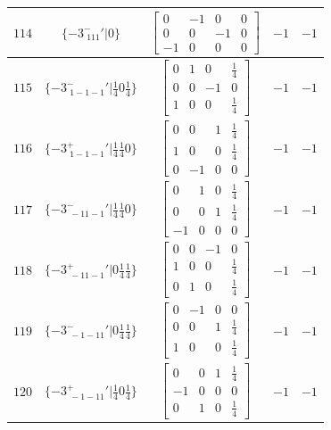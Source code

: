 \documentclass[fleqn,8pt]{jsarticle}
\begin{document}
\begin{longtable}{ccccc}
$ 114 $ & $ \{-3^{-}_{\,\,111}{}'|0\} $ & $ \begin{bmatrix} 0 & -1 & 0 & 0 \\ 0 & 0 & -1 & 0 \\ -1 & 0 & 0 & 0 \end{bmatrix} $ & $ -1 $ & $ -1 $ \\ \hline
$ 115 $ & $ \{-3^{-}_{\,\,1-1-1}{}'|\frac{1}{4} 0 \frac{1}{4}\} $ & $ \begin{bmatrix} 0 & 1 & 0 & \frac{1}{4} \\ 0 & 0 & -1 & 0 \\ 1 & 0 & 0 & \frac{1}{4} \end{bmatrix} $ & $ -1 $ & $ -1 $ \\ \hline
$ 116 $ & $ \{-3^{+}_{\,\,1-1-1}{}'|\frac{1}{4} \frac{1}{4} 0\} $ & $ \begin{bmatrix} 0 & 0 & 1 & \frac{1}{4} \\ 1 & 0 & 0 & \frac{1}{4} \\ 0 & -1 & 0 & 0 \end{bmatrix} $ & $ -1 $ & $ -1 $ \\ \hline
$ 117 $ & $ \{-3^{-}_{\,\,-11-1}{}'|\frac{1}{4} \frac{1}{4} 0\} $ & $ \begin{bmatrix} 0 & 1 & 0 & \frac{1}{4} \\ 0 & 0 & 1 & \frac{1}{4} \\ -1 & 0 & 0 & 0 \end{bmatrix} $ & $ -1 $ & $ -1 $ \\ \hline
$ 118 $ & $ \{-3^{+}_{\,\,-11-1}{}'|0 \frac{1}{4} \frac{1}{4}\} $ & $ \begin{bmatrix} 0 & 0 & -1 & 0 \\ 1 & 0 & 0 & \frac{1}{4} \\ 0 & 1 & 0 & \frac{1}{4} \end{bmatrix} $ & $ -1 $ & $ -1 $ \\ \hline
$ 119 $ & $ \{-3^{-}_{\,\,-1-11}{}'|0 \frac{1}{4} \frac{1}{4}\} $ & $ \begin{bmatrix} 0 & -1 & 0 & 0 \\ 0 & 0 & 1 & \frac{1}{4} \\ 1 & 0 & 0 & \frac{1}{4} \end{bmatrix} $ & $ -1 $ & $ -1 $ \\ \hline
$ 120 $ & $ \{-3^{+}_{\,\,-1-11}{}'|\frac{1}{4} 0 \frac{1}{4}\} $ & $ \begin{bmatrix} 0 & 0 & 1 & \frac{1}{4} \\ -1 & 0 & 0 & 0 \\ 0 & 1 & 0 & \frac{1}{4} \end{bmatrix} $ & $ -1 $ & $ -1 $ \\ \hline

\end{longtable}
\end{document}
